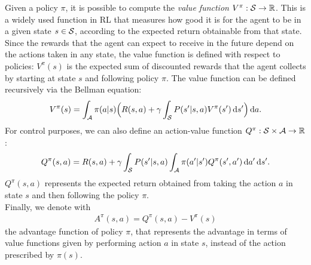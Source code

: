 \newline
Given a policy $\pi$, it is possible to compute the \emph{value function} $V^{\pi}: \mathcal{S} \rightarrow \mathbb{R}$. This is a widely used function in \ac{RL} that measures how good it is for the agent to be in a given state $s \in \mathcal{S}$, according to the expected return obtainable from that state. Since the rewards that the agent can expect to receive in the future depend on the actions taken in any state, the value function is defined with respect to policies: $V^{\pi}(s)$ is the expected sum of discounted rewards that the agent collects by starting at state $s$ and following policy $\pi$. The value function can be defined recursively via the Bellman equation: 
\begin{align} V^{\pi}(s) = \int_{\mathcal{A}} \pi(a|s) \Big(R(s,a) + \gamma \int_{\mathcal{S}}P(s'|s,a)V^{\pi}(s')\,\mathrm{d} s' \Big) \,\mathrm{d} a.\end{align}
For control purposes, we can also define an action-value function $Q^{\pi}: \mathcal{S} \times \mathcal{A} \rightarrow \mathbb{R}$: \begin{align} Q^{\pi}(s,a) = R(s,a) + \gamma \int_{\mathcal{S}} P(s'|s,a) \int_{\mathcal{A}} \pi(a'|s') Q^{\pi}(s',a') \,\mathrm{d} a' \,\mathrm{d} s'.\end{align}
$Q^{\pi}(s,a)$ represents the expected return obtained from taking the action $a$ in state $s$ and then following the policy $\pi$. \\
\newline
Finally, we denote with
\begin{align} A^{\pi}(s,a) = Q^{\pi}(s,a) - V^{\pi}(s) \end{align}
the advantage function of policy $\pi$, that represents the advantage in terms of value functions given by performing action $a$ in state $s$, instead of the action prescribed by $\pi(s)$.

